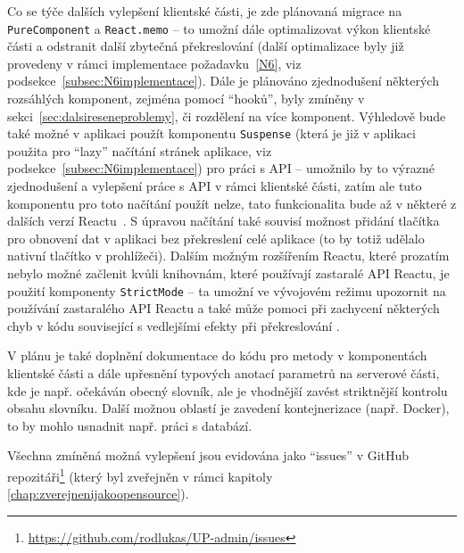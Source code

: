Co se týče dalších vylepšení klientské části, je zde plánovaná migrace na \verb|PureComponent| a \verb|React.memo| -- to umožní dále optimalizovat výkon klientské části a odstranit další zbytečná překreslování \cite{react-docs-api} (další optimalizace byly již provedeny v rámci implementace požadavku~\ref{N6}, viz podsekce~\ref{subsec:N6implementace}). Dále je plánováno zjednodušení některých rozsáhlých komponent, zejména pomocí \enquote{hooků}, byly zmíněny v sekci~\ref{sec:dalsireseneproblemy}, či rozdělení na více komponent. Výhledově bude také možné v aplikaci použít komponentu \verb|Suspense| (která je již v aplikaci použita pro \enquote{lazy} načítání stránek aplikace, viz podsekce~\ref{subsec:N6implementace}) pro práci s API -- umožnilo by to výrazné zjednodušení a vylepšení práce s API v rámci klientské části, zatím ale tuto komponentu pro toto načítání použít nelze, tato funkcionalita bude až v některé z dalších verzí Reactu~\cite{react-blog-roadmap}. S úpravou načítání také souvisí možnost přidání tlačítka pro obnovení dat v aplikaci bez překreslení celé aplikace (to by totiž udělalo nativní tlačítko v prohlížeči). Dalším možným rozšířením Reactu, které prozatím nebylo možné začlenit kvůli knihovnám, které používají zastaralé API Reactu, je použití komponenty \verb|StrictMode| -- ta umožní ve vývojovém režimu upozornit na používání zastaralého API Reactu a také může pomoci při zachycení některých chyb v kódu související s vedlejšími efekty při překreslování \cite{react-docs-strictmode}.

V plánu je také doplnění dokumentace do kódu pro metody v komponentách klientské části a dále upřesnění typových anotací parametrů na serverové části, kde je např. očekáván obecný slovník, ale je vhodnější zavést striktnější kontrolu obsahu slovníku. Další možnou oblastí je zavedení kontejnerizace (např. Docker), to by mohlo usnadnit např. práci s databází.

Všechna zmíněná možná vylepšení jsou evidována jako \enquote{issues} v GitHub repozitáři\footnote{\url{https://github.com/rodlukas/UP-admin/issues}} (který byl zveřejněn v rámci kapitoly \ref{chap:zverejnenijakoopensource}).
